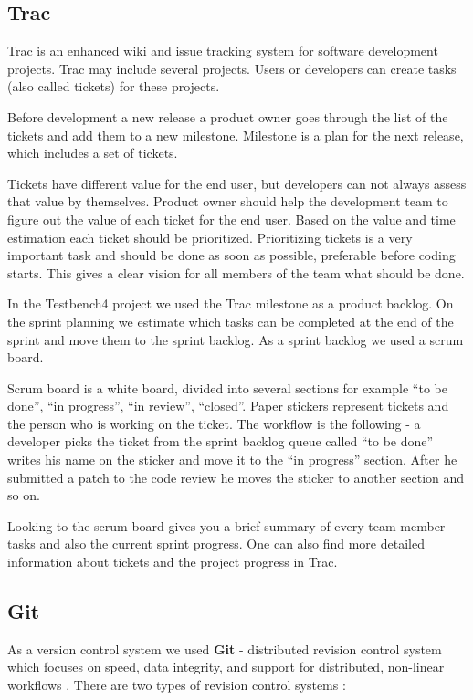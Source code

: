   \subsection{Trac}
  Trac is an enhanced wiki and issue tracking system for software development
  projects. Trac may include several projects. Users or developers can
  create tasks (also called tickets) for these projects. 
  
   Before development a new release a product owner goes through 
   the list of the tickets and add them to a new milestone.
  Milestone is a plan for the next release, which includes a set of tickets.

  Tickets have different value for the end user, but developers can not always
  assess that value by themselves. Product owner should help the development team
   to figure out the
  value of each ticket for the end user. Based on the value and time estimation
   each ticket should be prioritized.
  Prioritizing tickets is a very important task and should be done as soon as
  possible, preferable before coding starts. This gives a clear vision for all
  members of the team what should be done.

  In the Testbench4 project we used the Trac milestone as a product backlog. On
  the sprint planning we estimate which tasks can be completed at the end of the sprint 
  and move them to the sprint backlog. As a sprint backlog we used a scrum
  board.
  
  Scrum board is a white board, divided into several sections for example ``to be done'', ``in progress'', 
  ``in review'',
  ``closed''. Paper stickers represent tickets and the person who is working on
  the ticket.  
  The workflow is the following - a developer picks the
  ticket from the sprint backlog queue called ``to be done'' 
  writes his name on the sticker and move it to the ``in progress'' section.
  After he submitted a patch to the code review he moves the sticker to another
  section and so on.
  
  Looking to the scrum board gives you a brief summary of every team member tasks and 
  also the current sprint progress. One can also find more detailed information
  about tickets and the project progress in Trac.
 
 \subsection{Git}
  As a version control system we used \textbf{Git} - distributed revision control system
  which focuses on speed, data integrity, and support for distributed,
  non-linear workflows \cite{gitDocs}. There are two types of revision control
  systems :
  
